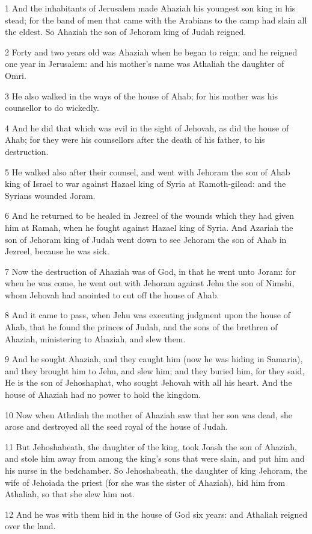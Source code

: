 \par 1 And the inhabitants of Jerusalem made Ahaziah his youngest son king in his stead; for the band of men that came with the Arabians to the camp had slain all the eldest. So Ahaziah the son of Jehoram king of Judah reigned.
\par 2 Forty and two years old was Ahaziah when he began to reign; and he reigned one year in Jerusalem: and his mother's name was Athaliah the daughter of Omri.
\par 3 He also walked in the ways of the house of Ahab; for his mother was his counsellor to do wickedly.
\par 4 And he did that which was evil in the sight of Jehovah, as did the house of Ahab; for they were his counsellors after the death of his father, to his destruction.
\par 5 He walked also after their counsel, and went with Jehoram the son of Ahab king of Israel to war against Hazael king of Syria at Ramoth-gilead: and the Syrians wounded Joram.
\par 6 And he returned to be healed in Jezreel of the wounds which they had given him at Ramah, when he fought against Hazael king of Syria. And Azariah the son of Jehoram king of Judah went down to see Jehoram the son of Ahab in Jezreel, because he was sick.
\par 7 Now the destruction of Ahaziah was of God, in that he went unto Joram: for when he was come, he went out with Jehoram against Jehu the son of Nimshi, whom Jehovah had anointed to cut off the house of Ahab.
\par 8 And it came to pass, when Jehu was executing judgment upon the house of Ahab, that he found the princes of Judah, and the sons of the brethren of Ahaziah, ministering to Ahaziah, and slew them.
\par 9 And he sought Ahaziah, and they caught him (now he was hiding in Samaria), and they brought him to Jehu, and slew him; and they buried him, for they said, He is the son of Jehoshaphat, who sought Jehovah with all his heart. And the house of Ahaziah had no power to hold the kingdom.
\par 10 Now when Athaliah the mother of Ahaziah saw that her son was dead, she arose and destroyed all the seed royal of the house of Judah.
\par 11 But Jehoshabeath, the daughter of the king, took Joash the son of Ahaziah, and stole him away from among the king's sons that were slain, and put him and his nurse in the bedchamber. So Jehoshabeath, the daughter of king Jehoram, the wife of Jehoiada the priest (for she was the sister of Ahaziah), hid him from Athaliah, so that she slew him not.
\par 12 And he was with them hid in the house of God six years: and Athaliah reigned over the land.

